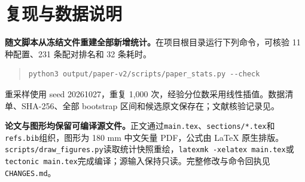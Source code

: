 \section{复现与数据说明}
\textbf{随文脚本从冻结文件重建全部新增统计。}在项目根目录运行下列命令，可核验 11 种配置、231 条配对排名和 32 条耗时。
\begin{quote}\small\begin{verbatim}
python3 output/paper-v2/scripts/paper_stats.py --check
\end{verbatim}\end{quote}
重采样使用 seed 20261027，重复 1,000 次，经验分位数采用线性插值。数据清单、SHA-256、全部 bootstrap 区间和候选原文保存在；文献核验记录见。

\textbf{论文与图形均保留可编译源文件。}正文通过\texttt{main.tex}、\texttt{sections/*.tex}和\texttt{refs.bib}组织，图形为 180 mm 中文矢量 PDF，公式由 LaTeX 原生排版。\texttt{scripts/draw\_figures.py}读取统计快照重绘，\texttt{latexmk -xelatex main.tex}或\texttt{tectonic main.tex}完成编译；源输入保持只读。完整修改与命令回执见\texttt{CHANGES.md}。


